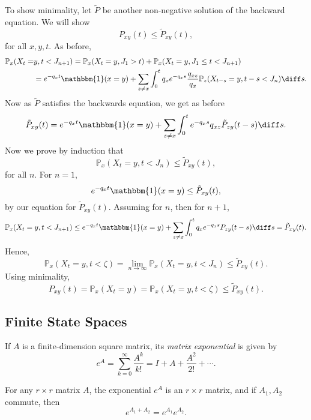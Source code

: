 \documentclass[12pt]{article}
\begin{document}
\begin{proofbox}
	To show minimality, let $\tilde P$ be another non-negative solution of the backward equation. We will show
	\[
	P_{xy}(t) \leq \tilde P_{xy}(t)
	,\]
	for all $x, y, t$. As before,
	\begin{align*}
		\mathbb{P}_x(X_t = &y, t < J_{n+1}) = \mathbb{P}_x(X_t = y, J_1 > t) + \mathbb{P}_x(X_t = y, J_1 \leq t < J_{n+1}) \\
						   &= e^{-q_x t}\mathbbm{1}(x = y) + \sum_{z \neq x} \int_{0}^{t} q_x e^{-q_x s} \frac{q_{xz}}{q_x} \mathbb{P}_z (X_{t-s} = y, t-s < J_n) \diff s.
	\end{align*}
	Now as $\tilde P$ satisfies the backwards equation, we get as before
	\[
		\tilde P_{xy}(t) = e^{-q_x t} \mathbbm{1}(x = y) + \sum_{z \neq x} \int_{0}^{t} e^{-q_x s} q_{xz} \tilde P_{zy}(t-s) \diff s
	.\]
	Now we prove by induction that
	\[
	\mathbb{P}_x(X_t = y, t < J_n) \leq \tilde P_{xy}(t)
	,\]
	for all $n$. For $n = 1$,
	\[
		e^{-q_x t}\mathbbm{1}(x = y) \leq \tilde P_{xy}(t)
	,\]
	by our equation for $\tilde P_{xy}(t)$. Assuming for $n$, then for $n+1$,
	\begin{align*}
		\mathbb{P}_x(X_t = y, t < J_{n+1}) \leq e^{-q_x t} \mathbbm{1}(x = y) + \sum_{z \neq x} \int_{0}^{t} q_x e^{-q_x s} P_{zy}(t-s) \diff s = \tilde P_{xy}(t).
	\end{align*}
	Hence,
	\[
	\mathbb{P}_x(X_t = y, t < \zeta) = \lim_{n \to \infty}\mathbb{P}_x(X_t = y, t < J_n) \leq \tilde P_{xy}(t)
	.\]
	Using minimality,
	\[
	P_{xy}(t) = \mathbb{P}_x(X_t = y) = \mathbb{P}_x(X_t = y, t < \zeta) \leq \tilde P_{xy}(t)
	.\]
\end{proofbox}

\subsection{Finite State Spaces}
\label{sub:finite_state_spaces}

\begin{definition}
	If $A$ is a finite-dimension square matrix, its \emph{matrix exponential} is given by
	\[
	e^{A} = \sum_{k = 0}^{\infty} \frac{A^{k}}{k!} = I + A + \frac{A^2}{2!} + \cdots
	.\]
\end{definition}

\begin{proposition}
	For any $r \times r$ matrix $A$, the exponential $e^{A}$ is an $r \times r$ matrix, and if $A_1, A_2$ commute, then
	\[
	e^{A_1 + A_2} = e^{A_1} e^{A_2}
	.\]
\end{proposition}
\end{document}
